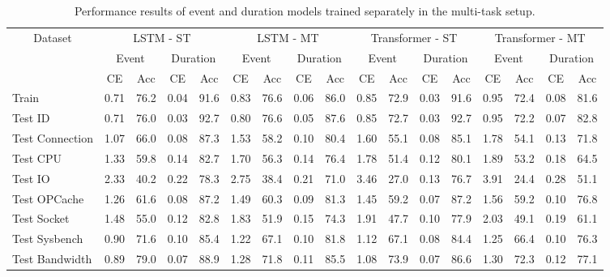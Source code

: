 \documentclass[preprint,12pt]{elsarticle}
\begin{document}
\begin{table}[tb]
\centering
\caption{Performance results of event and duration models trained separately in the multi-task setup.}
\label{tab:modeling-results}
\begin{adjustbox}{center, width=0.7\textwidth}
\begin{tabular}{|lll|cccc|cccc|cccc|cccc|}
\hline
\multicolumn{3}{|c|}{\multirow{3}{*}{Dataset}} & \multicolumn{4}{c|}{LSTM - ST} & \multicolumn{4}{c|}{LSTM - MT} & \multicolumn{4}{c|}{Transformer - ST} & \multicolumn{4}{c|}{Transformer - MT} \\ \cline{4-19}
\multicolumn{3}{|c|}{} & \multicolumn{2}{c}{Event} & \multicolumn{2}{c|}{Duration} & \multicolumn{2}{c}{Event} & \multicolumn{2}{c|}{Duration} & \multicolumn{2}{c}{Event} & \multicolumn{2}{c|}{Duration} & \multicolumn{2}{c}{Event} & \multicolumn{2}{c|}{Duration} \\
\multicolumn{3}{|c|}{} & CE & Acc & CE & Acc & CE & Acc & CE & Acc & CE & Acc & CE & Acc & CE & Acc & CE & Acc \\ \hline
\multicolumn{3}{|l|}{Train} & 0.71 & 76.2 & 0.04 & 91.6 & 0.83 & 76.6 & 0.06 & 86.0 & 0.85 & 72.9 & 0.03 & 91.6 & 0.95 & 72.4 & 0.08 & 81.6 \\
\multicolumn{3}{|l|}{Test ID} & 0.71 & 76.0 & 0.03 & 92.7 & 0.80 & 76.6 & 0.05 & 87.6 & 0.85 & 72.7 & 0.03 & 92.7 & 0.95 & 72.2 & 0.07 & 82.8 \\
\multicolumn{3}{|l|}{Test Connection} & 1.07 & 66.0 & 0.08 & 87.3 & 1.53 & 58.2 & 0.10 & 80.4 & 1.60 & 55.1 & 0.08 & 85.1 & 1.78 & 54.1 & 0.13 & 71.8 \\
\multicolumn{3}{|l|}{Test CPU} & 1.33 & 59.8 & 0.14 & 82.7 & 1.70 & 56.3 & 0.14 & 76.4 & 1.78 & 51.4 & 0.12 & 80.1 & 1.89 & 53.2 & 0.18 & 64.5 \\
\multicolumn{3}{|l|}{Test IO} & 2.33 & 40.2 & 0.22 & 78.3 & 2.75 & 38.4 & 0.21 & 71.0 & 3.46 & 27.0 & 0.13 & 76.7 & 3.91 & 24.4 & 0.28 & 51.1 \\
\multicolumn{3}{|l|}{Test OPCache} & 1.26 & 61.6 & 0.08 & 87.2 & 1.49 & 60.3 & 0.09 & 81.3 & 1.45 & 59.2 & 0.07 & 87.2 & 1.56 & 59.2 & 0.10 & 76.8 \\
\multicolumn{3}{|l|}{Test Socket} & 1.48 & 55.0 & 0.12 & 82.8 & 1.83 & 51.9 & 0.15 & 74.3 & 1.91 & 47.7 & 0.10 & 77.9 & 2.03 & 49.1 & 0.19 & 61.1 \\
\multicolumn{3}{|l|}{Test Sysbench} & 0.90 & 71.6 & 0.10 & 85.4 & 1.22 & 67.1 & 0.10 & 81.8 & 1.12 & 67.1 & 0.08 & 84.4 & 1.25 & 66.4 & 0.10 & 76.3 \\
\multicolumn{3}{|l|}{Test Bandwidth} & 0.89 & 79.0 & 0.07 & 88.9 & 1.28 & 71.8 & 0.11 & 85.5 & 1.08 & 73.9 & 0.07 & 86.6 & 1.30 & 72.3 & 0.12 & 77.1 \\ \hline
\end{tabular}
\end{adjustbox}
\end{table}
\end{document}
